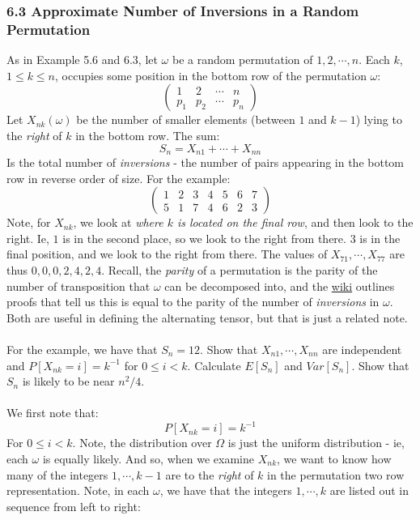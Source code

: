 \documentclass[12pt,a4paper]{article}
\newcommand{\1}[1]{\mathbbm{1}\left\{ #1 \right\}}
\begin{document}
\subsubsection{6.3 Approximate Number of Inversions in a Random Permutation} As in Example 5.6 and 6.3, let $\omega$ be a random permutation of $1, 2, \cdots, n$. Each $k$, $1 \leq k \leq n$, occupies some position in the bottom row of the permutation $\omega$:
$$
	\begin{pmatrix}
	1 & 2 & \cdots & n\\
	p_1 & p_2 & \cdots & p_n
	\end{pmatrix}
$$
Let $X_{nk}(\omega)$ be the number of smaller elements (between $1$ and $k-1$) lying to the \textit{right} of $k$ in the bottom row. The sum:
$$
	S_n = X_{n1} + \cdots + X_{nn}
$$
Is the total number of \textit{inversions} - the number of pairs appearing in the bottom row in reverse order of size. For the example:
$$
	\begin{pmatrix}
	1 & 2 & 3 & 4 & 5 & 6 & 7\\
	5 & 1 & 7 & 4 & 6 & 2 & 3
	\end{pmatrix}
$$
Note, for $X_{nk}$, we look at \textit{where $k$ is located on the final row}, and then look to the right. Ie, $1$ is in the second place, so we look to the right from there. $3$ is in the final position, and we look to the right from there. The values of $X_{71}, \cdots, X_{77}$ are thus $0, 0, 0, 2, 4, 2, 4$. Recall, the \textit{parity} of a permutation is the parity of the number of transposition that $\omega$ can be decomposed into, and the \href{https://en.wikipedia.org/wiki/Parity_of_a_permutation#Equivalence_of_the_two_definitions}{wiki} outlines proofs that tell us this is equal to the parity of the number of \textit{inversions} in $\omega$. Both are useful in defining the alternating tensor, but that is just a related note.
\\\\
For the example, we have that $S_n = 12$. Show that $X_{n1}, \cdots, X_{nn}$ are independent and $P[X_{nk} = i] = k^{-1}$ for $0 \leq i < k$. Calculate $E[S_n]$ and $Var[S_n]$. Show that $S_n$ is likely to be near $n^2/4$.
\\\\
We first note that:
$$
	P[X_{nk} = i] = k^{-1}
$$
For $0 \leq i < k$. Note, the distribution over $\Omega$ is just the uniform distribution - ie, each $\omega$ is equally likely. And so, when we examine $X_{nk}$, we want to know how many of the integers $1, \cdots, k - 1$ are to the \textit{right} of $k$ in the permutation two row representation. Note, in each $\omega$, we have that the integers $1, \cdots, k$ are listed out in sequence from left to right:
\end{document}
